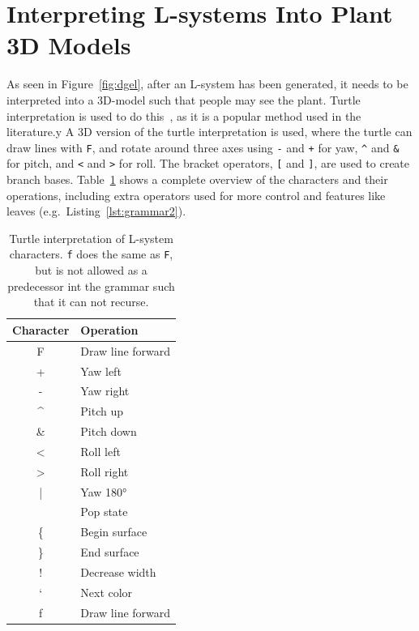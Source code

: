 \section{Interpreting L-systems Into Plant 3D Models}
\label{sec:interpreting}
As seen in Figure~\ref{fig:dgel}, after an \gls{L-system} has been generated, it needs to be interpreted into a 3D-model such that people may see the plant.
Turtle interpretation is used to do this~\cite{2012Prusinkiewicz}, as it is a popular method used in the literature.y 
A 3D version of the turtle interpretation is used, where the turtle can draw lines with \texttt{F}, and rotate around three axes using \texttt{-} and \texttt{+} for yaw, \texttt{\textasciicircum} and \texttt{\&} for pitch, and \texttt{<} and \texttt{>} for roll.
The bracket operators, \texttt{[} and \texttt{]}, are used to create \glspl{branch base}.
Table~\ref{tab:turtle-cmd} shows a complete overview of the characters and their operations, including extra operators used for more control and features like leaves (e.g.\ Listing~\ref{lst:grammar2}).

\begin{table}
    \centering
    \begin{tabular}{| c | l |}
    \hline
    \textbf{Character} & \textbf{Operation} \\ \hline
    F & Draw line forward \\ \hline
    + & Yaw left \\ \hline
    - & Yaw right \\ \hline
    \textasciicircum & Pitch up \\ \hline
    \& & Pitch down \\ \hline
    < & Roll left \\ \hline
    > & Roll right \\ \hline
    | & Yaw 180° \\ \hline
    [ & Push state \\ \hline
    ] & Pop state \\ \hline
    \{ & Begin surface \\ \hline
    \} & End surface \\ \hline
    ! & Decrease width \\ \hline
    ` & Next color \\ \hline
    f & Draw line forward \\
    \hline
    \end{tabular}
    \caption[Turtle interpretation of L-system characters]{Turtle interpretation of \gls{L-system} characters. \texttt{f} does the same as \texttt{F}, but is not allowed as a predecessor int the grammar such that it can not recurse.}
    \label{tab:turtle-cmd}
\end{table}


